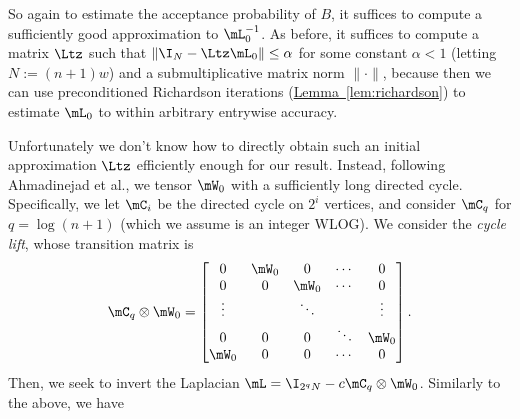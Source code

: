 \documentclass[11pt]{article}
\newcommand{\expref}[2]{\texorpdfstring{\hyperref[#2]{#1~\ref{#2}}}{#1~\ref{#2}}}
\begin{document}
   So again to estimate the acceptance probability of $B$, it suffices to compute a sufficiently good approximation to $\mL_0^{-1}$.
   As before, it suffices to compute a matrix
   $\Ltz$ such that $\|\I_N-\Ltz \mL_0\| \leq \alpha$ for some constant $\alpha<1$ (letting $N:=(n+1)w$) and a submultiplicative matrix norm $\|\cdot\|$, because then we can use preconditioned Richardson iterations (\expref{Lemma}{lem:richardson}) to estimate $\mL_0$ to within arbitrary entrywise accuracy.
   
   Unfortunately %
%
%
%
%
   we don't know how to directly obtain such an initial approximation $\Ltz$ efficiently
enough for our result. Instead, following 
%
Ahmadinejad  %
et al., we tensor $\mW_0$ with a sufficiently long directed cycle.  Specifically, we let $\mC_i$ be the directed cycle on $2^i$ vertices, and consider $\mC_q$ for $q=\log(n+1)$ (which we assume is an integer WLOG). We consider the \emph{cycle lift}, whose transition matrix is
    $$\mC_q\otimes\mW_0 =
    \begin{bmatrix}
    0 & \mW_0 & 0 & \cdots & 0 \\
    0 & 0 & \mW_0 & \cdots & 0 \\
    \vdots & & \ddots & & \vdots\\
    0 & 0 & 0 & \ddots & \mW_0\\
    \mW_0 & 0 & 0 & \cdots &  0 \\
    \end{bmatrix}.$$  %
    Then, we seek to invert the Laplacian $\mL = \I_{2^qN} - c \mC_q \otimes \mW_0$.  Similarly
to the above, we have %
\end{document}
